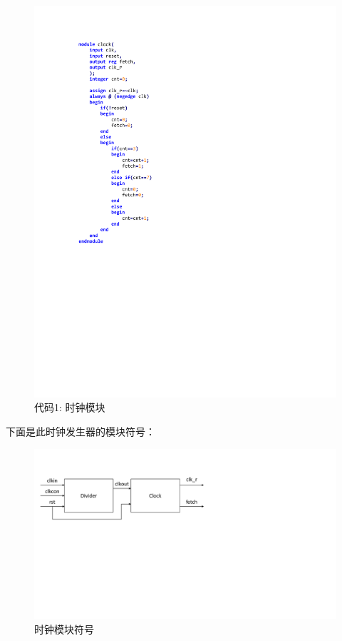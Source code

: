 \documentclass[titlepage, 11pt]{article}
\begin{document}
\begin{figure}[H]
\begin{minipage}[H]{0.5\linewidth}
			\includegraphics[scale=1]{14.pdf}  
			\caption*{}  
			\end{minipage}
			\caption*{代码1: 时钟模块}  
		\end{figure} 
		下面是此时钟发生器的模块符号：
		\begin{figure}[H]
			\centering
			\includegraphics[scale=0.5]{15.pdf}
			\caption{时钟模块符号}
		\end{figure}
\end{document}
